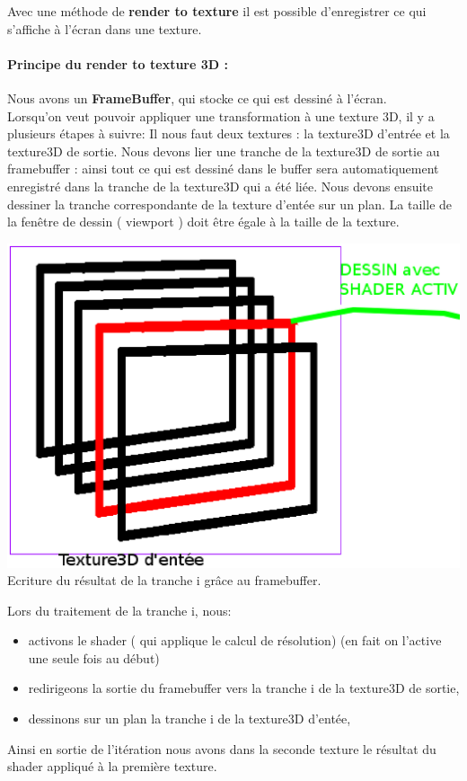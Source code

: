 \documentclass[a4paper,10pt]{article}
\begin{document}
Avec une méthode de \textbf{render to texture} il est possible
d'enregistrer ce qui s'affiche à l'écran dans une texture.\\

\paragraph*{Principe du render to texture 3D :}

Nous avons un \textbf{FrameBuffer}, qui stocke ce qui est dessiné à l'écran.\\

Lorsqu'on veut pouvoir appliquer une transformation à une texture 3D, il y a plusieurs étapes à suivre:
Il nous faut deux textures : la texture3D d'entrée et la texture3D de sortie. Nous
devons lier une tranche de la texture3D de sortie au framebuffer : ainsi tout ce qui est dessiné dans le buffer
sera automatiquement enregistré dans la tranche de la texture3D qui a été liée.
Nous devons ensuite dessiner la tranche correspondante de la texture d'entée sur un plan. La taille de la fenêtre de dessin ( viewport ) doit être égale à la taille de la texture.

    \begin{center}
	\includegraphics[scale=0.4]{Framebuffer.ps}\\
	Ecriture du résultat de la tranche i grâce au framebuffer.
    \end{center}
    
Lors du traitement de la tranche i, nous:\\
\begin{itemize}
\item activons le shader ( qui applique le calcul de résolution) (en
  fait on l'active une seule fois au début)\\
\item redirigeons la sortie du framebuffer vers la tranche i de la texture3D de sortie,\\
\item dessinons sur un plan la tranche i de la texture3D d'entée,\\
\end{itemize}
Ainsi en sortie de l'itération nous avons dans la seconde texture le
résultat du shader appliqué à la première texture.\\
 
\end{document}
